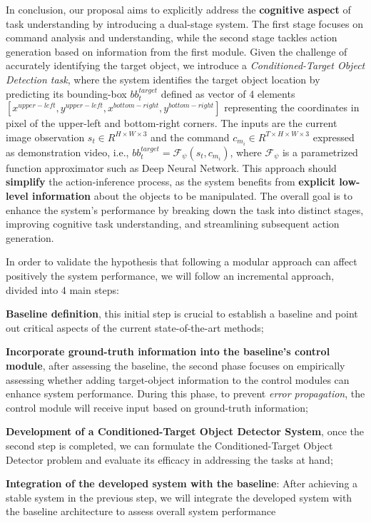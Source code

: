 In conclusion, our proposal aims to explicitly address the \textbf{cognitive aspect} of task understanding by introducing a dual-stage system. The first stage focuses on command analysis and understanding, while the second stage tackles action generation based on information from the first module. Given the challenge of accurately identifying the target object, we introduce a \textit{Conditioned-Target Object Detection task}, where the system identifies the target object location by predicting its bounding-box $bb_{t}^{target}$ defined as vector of 4 elements $[x^{upper-left},y^{upper-left}, x^{bottom-right}, y^{bottom-right}]$ representing the coordinates in pixel of the upper-left and bottom-right corners. The inputs are the current image observation $s_{t} \in R^{H \times W \times 3}$ and the command $c_{m_{i}} \in R^{T \times H \times W \times 3}$ expressed as demonstration video, i.e., $bb_{t}^{target} = \mathcal{F}_{\psi}(s_{t}, c_{m_{i}})$, where $\mathcal{F}_{\psi}$ is a parametrized function approximator such as Deep Neural Network. This approach should \textbf{simplify} the action-inference process, as the system benefits from \textbf{explicit low-level information} about the objects to be manipulated. The overall goal is to enhance the system's performance by breaking down the task into distinct stages, improving cognitive task understanding, and streamlining subsequent action generation.

In order to validate the hypothesis that following a modular approach can affect positively the system performance, we will follow an incremental approach, divided into 4 main steps:
\begin{enumerate*}[label=(\arabic*)]
    \item \textbf{Baseline definition}, this initial step is crucial to establish a baseline and point out critical aspects of the current state-of-the-art methods;
    \item \textbf{Incorporate ground-truth information into the baseline's control module}, after assessing the baseline, the second phase focuses on empirically assessing whether adding target-object information to the control modules can enhance system performance. During this phase, to prevent \textit{error propagation}, the control module will receive input based on ground-truth information;
    \item \textbf{Development of a Conditioned-Target Object Detector System}, once the second step is completed, we can formulate the Conditioned-Target Object Detector problem and evaluate its efficacy in addressing the tasks at hand;
    \item \textbf{Integration of the developed system with the baseline}: After achieving a stable system in the previous step, we will integrate the developed system with the baseline architecture to assess overall system performance
\end{enumerate*}

